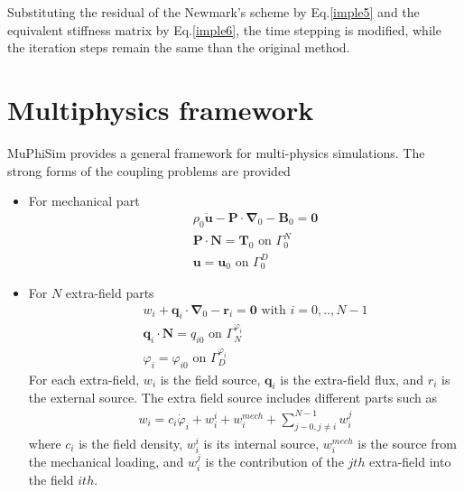 \documentclass[oneside,11pt,times]{book}
\begin{document}
Substituting the residual of the Newmark's scheme by Eq.\eqref{imple5} and the equivalent stiffness matrix by Eq.\eqref{imple6}, the time stepping is modified, while the iteration steps remain the same than the original method.


\chapter{\label{extraDof}Multiphysics framework}

MuPhiSim provides a general framework for multi-physics simulations. The strong forms of the coupling problems are provided
\begin{itemize}
	\item For mechanical part
	\begin{eqnarray}
	&&\rho_0 \ddot{\mathbf{u}}-\mathbf{P}\cdot \bm{\nabla}_0-\mathbf{B}_0=\mathbf{0}\\
	&&\mathbf{P}\cdot \mathbf{N}=\mathbf{T}_0 \text{ on } \Gamma_0^N \\
	&&\mathbf{u}=\mathbf{u}_0 \text{ on } \Gamma_0^D
	\end{eqnarray}
	\item For $N$ extra-field parts
	\begin{eqnarray}  \label{eq:extraField}
	&&w_i+\mathbf{q}_i\cdot \bm{\nabla}_0-\mathbf{r}_i=\mathbf{0} \text{ with } i=0,..,N-1\\
	&&\mathbf{q}_i\cdot\mathbf{N} = q_{i0} \text{ on } \Gamma_N^{\varphi_i}
	\\
	&&\varphi_i=\varphi_{i0} \text{ on } \Gamma_D^{\varphi_i}
	\end{eqnarray}
	For each extra-field, $w_i$ is the field source, $\mathbf{q}_i$ is the extra-field flux, and $r_i$ is the external source. The extra field source includes different parts such as
	\begin{eqnarray}
	w_i = c_i\dot{\varphi}_i + w_i^i + w_i^{mech} + \sum_{j-0, j\neq i}^{N-1} w_i^j
	\end{eqnarray}
	where $ c_i$ is the field density, $w_i^i$ is its internal source, $ w_i^{mech}$ is the source from the mechanical loading, and $ w_i^j$ is the contribution of the $jth$ extra-field into the field $ith$.
\end{itemize}
\end{document}
